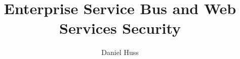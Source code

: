 \documentclass{llncs}
\begin{document}
\author{Daniel Huss}
\title{Enterprise Service Bus and Web Services Security}

\maketitle

\frontmatter%
\setcounter{tocdepth}{2}
\makeatletter
\renewcommand*\l@author[2]{}
\renewcommand*\l@title[2]{}
\makeatletter
\tableofcontents
\mainmatter%

%

\printindex
\end{document}
